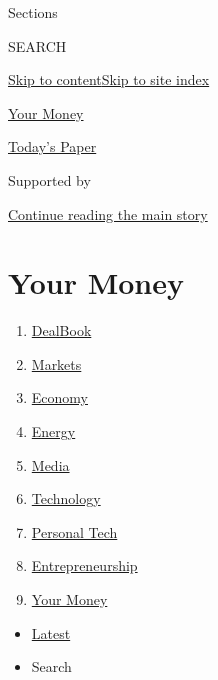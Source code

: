 Sections

SEARCH

\protect\hyperlink{site-content}{Skip to
content}\protect\hyperlink{site-index}{Skip to site index}

\href{https://www.nytimes.com/section/your-money}{Your Money}

\href{https://myaccount.nytimes.com/auth/login?response_type=cookie\&client_id=vi}{}

\href{https://www.nytimes.com/section/todayspaper}{Today's Paper}

Supported by

\protect\hyperlink{after-sponsor}{Continue reading the main story}

\hypertarget{your-money}{%
\section{Your Money}\label{your-money}}

\begin{enumerate}
\def\labelenumi{\arabic{enumi}.}
\tightlist
\item
  \href{/pages/business/dealbook/index.html}{DealBook}
\item
  \href{https://markets.on.nytimes.com}{Markets}
\item
  \href{/section/business/economy}{Economy}
\item
  \href{/section/business/energy-environment}{Energy}
\item
  \href{/section/business/media}{Media}
\item
  \href{/section/technology}{Technology}
\item
  \href{/section/technology/personaltech}{Personal Tech}
\item
  \href{/section/business/smallbusiness}{Entrepreneurship}
\item
  \href{/section/your-money}{Your Money}
\end{enumerate}

\begin{itemize}
\tightlist
\item
  \protect\hyperlink{stream-panel}{Latest}
\item
  Search
\end{itemize}

